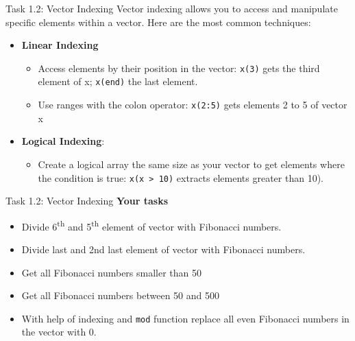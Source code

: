 \begin{frame}{Task 1.2: Vector Indexing}
Vector indexing allows you to access and manipulate specific elements within a vector.  Here are the most common techniques:
\vspace{1em}

\begin{itemize}
    \item \textbf{Linear Indexing}
    \begin{itemize}
        \item Access elements by their position in the vector: \lstinline{x(3)} gets the third element of x; \lstinline{x(end)} the last element.
        \item Use ranges with the colon operator:  \lstinline{x(2:5)} gets elements 2 to 5 of vector x
    \end{itemize}
    \item \textbf{Logical Indexing}:

    \begin{itemize}
        \item Create a logical array the same size as your vector to get elements where the condition is true: \lstinline{x(x > 10)} extracts elements greater than 10).
    \end{itemize}
\end{itemize}
\end{frame}

\begin{frame}{Task 1.2: Vector Indexing}
\textbf{Your tasks}
\begin{itemize}
    \item Divide 6\textsuperscript{th} and 5\textsuperscript{th} element of vector with Fibonacci numbers. 
    \item Divide last and 2nd last element of vector with Fibonacci numbers. 
    \item Get all Fibonacci numbers smaller than 50 
     \item Get all Fibonacci numbers between 50 and 500
    \item With help of indexing and \lstinline{mod} function replace all even Fibonacci numbers in the vector with 0.
\end{itemize}
\end{frame}

